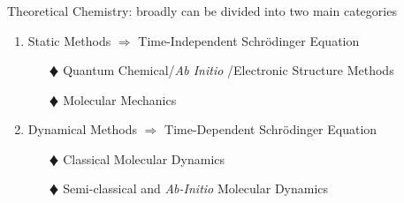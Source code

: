 \documentclass[slidestop,mathserif,compress,xcolor=svgnames]{beamer}
\newenvironment{eblock}[0]
{
\begin{beamerboxesrounded}[upper=uppercol2,lower=lowercol2,shadow=true]}
{\end{beamerboxesrounded}}
\begin{document}
\begin{frame}
  \frametitle{ \small }
  \begin{columns}
    \column{11cm}
    \begin{eblock}{Theoretical Chemistry: broadly can be divided into two main categories}
      \begin{enumerate}
      \item Static Methods {\Large$\Rightarrow$} {\color{blue}Time-Independent Schr\"{o}dinger Equation}
        \begin{enumerate}
        \item[$\vardiamond$] Quantum Chemical/\emph{Ab Initio} /Electronic Structure Methods
        \item[$\vardiamond$] Molecular Mechanics
        \end{enumerate}
      \item Dynamical Methods {\Large$\Rightarrow$} {\color{blue}Time-Dependent Schr\"{o}dinger Equation}
        \begin{enumerate}
        \item[$\vardiamond$] Classical Molecular Dynamics
        \item[$\vardiamond$] Semi-classical and \textit{Ab-Initio} Molecular Dynamics
        \end{enumerate}
      \end{enumerate}
    \end{eblock}
  \end{columns}
\end{frame}

\end{document}
